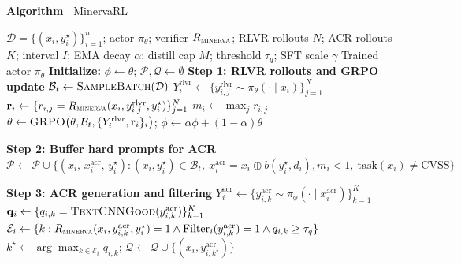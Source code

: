 \begin{algorithm}[t]
\label{alg:minervarl}
\centering
\begin{minipage}{0.93\linewidth}
\noindent\makebox[\linewidth][l]{\rule{0.86\linewidth}{0.8pt}}\par
\vspace{2pt}
{\normalsize\textbf{Algorithm~\thealgorithm} MinervaRL}\par
\vspace{2pt}
\noindent\makebox[\linewidth][l]{\rule{0.86\linewidth}{0.4pt}}\par
\vspace{3pt}
\footnotesize
\begin{algorithmic}[1]
\REQUIRE $\mathcal{D}=\{(x_i,y_i^\star)\}_{i=1}^{n}$; actor $\pi_\theta$; verifier $R_{\textsc{minerva}}$; RLVR rollouts $N$; ACR rollouts $K$; interval $I$; EMA decay $\alpha$; distill cap $M$; threshold $\tau_q$; SFT scale $\gamma$
\ENSURE Trained actor $\pi_\theta$
\STATE \textbf{Initialize:} $\phi\gets\theta$; $\mathcal{P},\mathcal{Q}\gets\emptyset$
  \STATE \textbf{Step 1: RLVR rollouts and GRPO update}
  \STATE $\mathcal{B}_t\gets\textsc{SampleBatch}(\mathcal{D})$
    \STATE $Y_i^{\mathrm{rlvr}}\gets\{y_{i,j}^{\mathrm{rlvr}}\sim\pi_\theta(\cdot\mid x_i)\}_{j=1}^{N}$
    \STATE $\mathbf{r}_i\gets\{r_{i,j}=R_{\textsc{minerva}}(x_i,y_{i,j}^{\mathrm{rlvr}},y_i^\star)\}_{j=1}^{N}$
    \STATE $m_i\gets\max_j r_{i,j}$
  \ENDFOR
  \STATE $\theta\gets\textsc{GRPO}\!\left(\theta,\mathcal{B}_t,\{Y_i^{\mathrm{rlvr}},\mathbf{r}_i\}_{i}\right)$;\quad
  $\phi\gets\alpha\phi+(1-\alpha)\theta$

  \STATE \textbf{Step 2: Buffer hard prompts for ACR}
  \STATE $\mathcal{P}\gets\mathcal{P}\cup
  \{(x_i,\,x_i^{\mathrm{acr}},\,y_i^\star):
  (x_i,y_i^\star)\in\mathcal{B}_t,\ x_i^{\mathrm{acr}}=x_i\oplus b(y_i^\star,d_i),
  m_i<1,\ \mathrm{task}(x_i)\ne\mathrm{CVSS}\}$

  \STATE \textbf{Step 3: ACR generation and filtering}
      \STATE $Y_i^{\mathrm{acr}}\gets\{y_{i,k}^{\mathrm{acr}}\sim\pi_\phi(\cdot\mid x_i^{\mathrm{acr}})\}_{k=1}^{K}$
      \STATE $\mathbf{q}_i\gets\{q_{i,k}=\textsc{TextCNNGood}(y_{i,k}^{\mathrm{acr}})\}_{k=1}^{K}$
      \STATE $\mathcal{E}_i\gets
      \{k:
      R_{\textsc{minerva}}(x_i,y_{i,k}^{\mathrm{acr}},y_i^\star)=1
      \wedge \mathrm{Filter}_i(y_{i,k}^{\mathrm{acr}})=1
      \wedge q_{i,k}\ge\tau_q\}$
        \STATE $k^\star\gets\arg\max_{k\in\mathcal{E}_i}q_{i,k}$;\quad
        $\mathcal{Q}\gets\mathcal{Q}\cup\{(x_i,y_{i,k^\star}^{\mathrm{acr}})\}$
      \ENDIF
    \ENDFOR


\end{algorithmic}
\end{minipage}
\end{algorithm}
